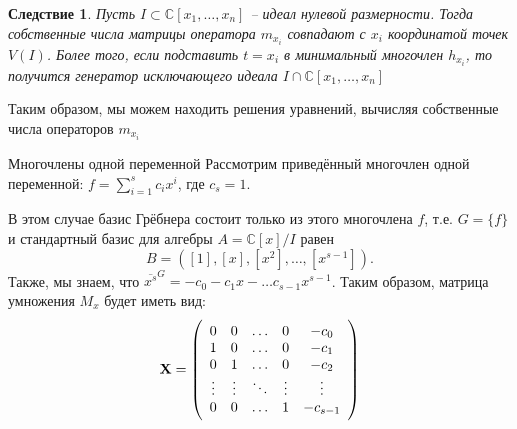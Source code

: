 \documentclass[notheorems,aspectratio=169]{beamer}
\newtheorem{corollary}{Следствие}
\begin{document}
    
    

\begin{frame}
    \begin{corollary}
        Пусть $I\subset\mathbb{C}[x_1,\dots, x_n]$ -- идеал нулевой размерности. Тогда собственные числа матрицы оператора $m_{x_i}$ совпадают с $x_i$ координатой точек $V(I)$. Более того, если подставить $t = x_i$ в минимальный многочлен $h_{x_i}$, то получится генератор исключающего идеала $I\cap\mathbb{C}[x_1,\dots, x_n]$
    \end{corollary}
    
    Таким образом, мы можем находить решения уравнений, вычисляя собственные числа операторов $m_{x_i}      $
\end{frame}

\begin{frame}{Многочлены одной переменной}
    Рассмотрим приведённый многочлен одной переменной: $f=\sum_{i=1}^s c_ix^i$, где  $c_s = 1$.
    
    В этом случае базис Грёбнера состоит только из этого многочлена $f$, т.е. $G = \{f\}$ и стандартный базис для алгебры $A=\mathbb{C}[x]/I$ равен
    $$
        B = \left([1],[x],[x^2],\dots,[x^{s-1}]\right).
    $$
    Также, мы знаем, что $\overline{x^s}^G = -c_0-c_1x-\dots c_{s-1}x^{s-1}$. Таким образом, матрица умножения $M_x$ будет иметь вид:
    \begin{displaymath}
        {\bf X} =
        \left( \begin{array}{ccccc}
        0 & 0 & \ldots & 0 & -c_0 \\
        1 & 0 & \ldots & 0 & -c_1 \\
        0 & 1 & \ldots & 0 & -c_2 \\
        \vdots & \vdots & \ddots &\vdots & \vdots \\
         0 & 0 & \ldots & 1 & -c_{s-1}
        \end{array} \right)
    \end{displaymath}
\end{frame}
\end{document}
